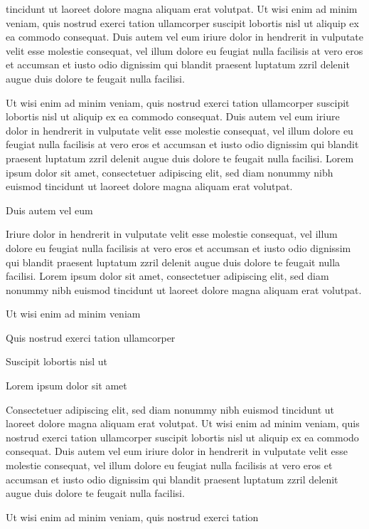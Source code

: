 \documentclass[11pt,twoside]{article}\makeatletter
\begin{document}
      tincidunt ut laoreet dolore magna aliquam erat volutpat. Ut wisi enim
      ad minim veniam, quis nostrud exerci tation ullamcorper suscipit
      lobortis nisl ut aliquip ex ea commodo consequat. Duis autem vel eum
      iriure dolor in hendrerit in vulputate velit esse molestie consequat,
      vel illum dolore eu feugiat nulla facilisis at vero eros et accumsan
      et iusto odio dignissim qui blandit praesent luptatum zzril delenit
      augue duis dolore te feugait nulla facilisi.\par Ut wisi enim ad minim veniam, quis nostrud exerci tation
      ullamcorper suscipit lobortis nisl ut aliquip ex ea commodo
      consequat. Duis autem vel eum iriure dolor in hendrerit in vulputate
      velit esse molestie consequat, vel illum dolore eu feugiat nulla
      facilisis at vero eros et accumsan et iusto odio dignissim qui blandit
      praesent luptatum zzril delenit augue duis dolore te feugait nulla
      facilisi. Lorem ipsum dolor sit amet, consectetuer adipiscing elit,
      sed diam nonummy nibh euismod tincidunt ut laoreet dolore magna
      aliquam erat volutpat. \par Duis autem vel eum \par Iriure dolor in hendrerit in vulputate velit esse molestie
      consequat, vel illum dolore eu feugiat nulla facilisis at vero eros et
      accumsan et iusto odio dignissim qui blandit praesent luptatum zzril
      delenit augue duis dolore te feugait nulla facilisi. Lorem ipsum dolor
      sit amet, consectetuer adipiscing elit, sed diam nonummy nibh euismod
      tincidunt ut laoreet dolore magna aliquam erat volutpat. \par Ut wisi enim ad minim veniam\par Quis nostrud exerci tation ullamcorper \par Suscipit lobortis nisl ut \par Lorem ipsum dolor sit amet\par Consectetuer adipiscing elit, sed diam nonummy nibh euismod
      tincidunt ut laoreet dolore magna aliquam erat volutpat. Ut wisi enim
      ad minim veniam, quis nostrud exerci tation ullamcorper suscipit
      lobortis nisl ut aliquip ex ea commodo consequat. Duis autem vel eum
      iriure dolor in hendrerit in vulputate velit esse molestie consequat,
      vel illum dolore eu feugiat nulla facilisis at vero eros et accumsan
      et iusto odio dignissim qui blandit praesent luptatum zzril delenit
      augue duis dolore te feugait nulla facilisi.\par Ut wisi enim ad minim veniam, quis nostrud exerci tation
\end{document}
